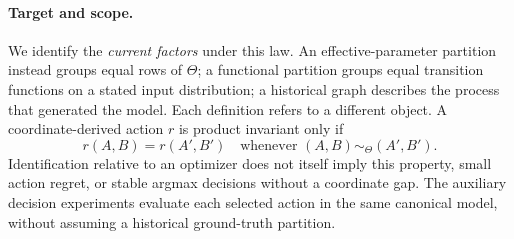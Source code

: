 \paragraph{Target and scope.}
We identify the \emph{current factors} under this law. An effective-parameter
partition instead groups equal rows of $\Theta$; a functional partition
groups equal transition functions on a stated input distribution; a
historical graph describes the process that generated the model. Each definition refers to a different object. A coordinate-derived action
$r$ is product invariant only if
\begin{equation}
 r(A,B)=r(A',B')\quad\text{whenever }(A,B)\sim_\Theta(A',B').
 \label{eq:action_invariance}
\end{equation}
Identification relative to an optimizer does not itself imply this property,
small action regret, or stable argmax decisions without a coordinate gap.
The auxiliary decision experiments evaluate each selected action in the
same canonical model, without assuming a historical ground-truth partition.
